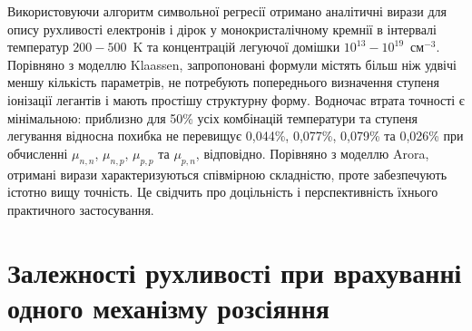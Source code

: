 \documentclass[fleqn,twoside,twocolumn,nofootinbib,showkeys]{revtex4} %
\begin{document}
Використовуючи алгоритм символьної регресії отримано аналітичні вирази 
для опису рухливості електронів і дірок у монокристалічному кремнії в інтервалі температур $200-500$~K 
та концентрацій легуючої домішки $10^{13}-10^{19}$~см$^{-3}$.
Порівняно з моделлю Klaassen, запропоновані формули містять більш ніж удвічі меншу кількість параметрів, 
не потребують попереднього визначення ступеня іонізації легантів і мають простішу структурну форму. 
Водночас втрата точності є мінімальною: 
приблизно для 50\% усіх комбінацій температури та ступеня легування
відносна похибка не перевищує  0,044\%, 0,077\%, 0,079\% та 0,026\% при обчисленні
$\mu_{n,n}$, $\mu_{n,p}$, $\mu_{p,p}$ та $\mu_{p,n}$, відповідно.
Порівняно з моделлю Arora, отримані вирази характеризуються співмірною складністю, 
проте забезпечують істотно вищу точність. 
Це свідчить про доцільність і перспективність їхнього практичного застосування.

\appendix


\renewcommand{\thetable}{\thesection\arabic{table}}

\section{Залежності рухливості при врахуванні одного механізму розсіяння}\label{App1}
\end{document}
